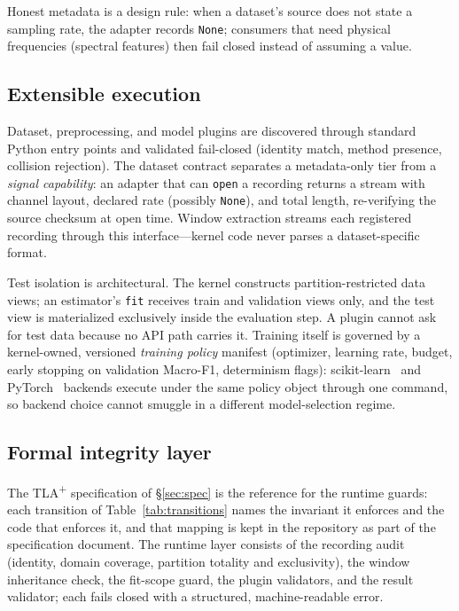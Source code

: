 Honest metadata is a design rule: when a dataset's source does not state a
sampling rate, the adapter records \texttt{None}; consumers that need
physical frequencies (spectral features) then fail closed instead of
assuming a value.

\subsection{Extensible execution}

Dataset, preprocessing, and model plugins are discovered through standard
Python entry points and validated fail-closed (identity match, method
presence, collision rejection). The dataset contract separates a
metadata-only tier from a \emph{signal capability}: an adapter that can
\texttt{open} a recording returns a stream with channel layout, declared
rate (possibly \texttt{None}), and total length, re-verifying the source
checksum at open time. Window extraction streams each registered recording
through this interface---kernel code never parses a dataset-specific format.

Test isolation is architectural. The kernel constructs partition-restricted
data views; an estimator's \texttt{fit} receives train and validation views
only, and the test view is materialized exclusively inside the evaluation
step. A plugin cannot ask for test data because no API path carries it.
Training itself is governed by a kernel-owned, versioned \emph{training
policy} manifest (optimizer, learning rate, budget, early stopping on
validation Macro-F1, determinism flags): scikit-learn~\cite{pedregosa2011scikit}
and PyTorch~\cite{paszke2019pytorch} backends execute under the same policy
object through one command, so backend choice cannot smuggle in a different
model-selection regime.

\subsection{Formal integrity layer}

The TLA\textsuperscript{+} specification of \S\ref{sec:spec} is the
reference for the runtime guards: each transition of
Table~\ref{tab:transitions} names the invariant it enforces and the code
that enforces it, and that mapping is kept in the repository as part of the
specification document. The runtime layer consists of the recording audit
(identity, domain coverage, partition totality and exclusivity), the window
inheritance check, the fit-scope guard, the plugin validators, and the
result validator; each fails closed with a structured, machine-readable
error.

